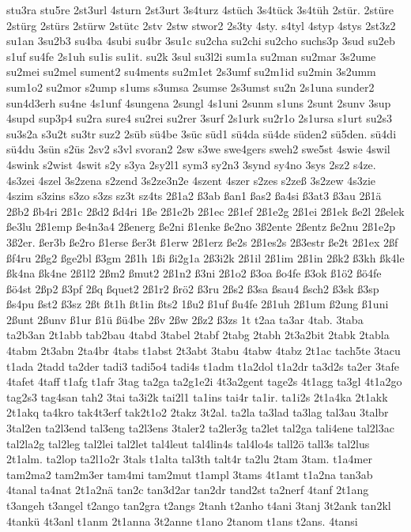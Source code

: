 {stu3ra
stu5re
2st3url
4sturn
2st3urt
3s4turz
4stüch
3s4tück
3s4tüh
2stür.
2stüre
2stürg
2stürs
2stürw
2stütc
2stv
2stw
stwor2
2s3ty
4sty.
s4tyl
4styp
4stys
2st3z2
su1an
3su2b3
su4ba
4subi
su4br
3su1c
su2cha
su2chi
su2cho
suchs3p
3sud
su2eb
s1uf
su4fe
2s1uh
su1is
su1it.
su2k
3sul
su3l2i
sum1a
su2man
su2mar
3s2ume
su2mei
su2mel
sument2
su4ments
su2m1et
2s3umf
su2m1id
su2min
3s2umm
sum1o2
su2mor
s2ump
s1ums
s3umsa
2sumse
2s3umst
su2n
2s1una
sunder2
sun4d3erh
su4ne
4s1unf
4sungena
2sungl
4s1uni
2sunm
s1uns
2sunt
2sunv
3sup
4supd
sup3p4
su2ra
sure4
su2rei
su2rer
3surf
2s1urk
su2r1o
2s1ursa
s1urt
su2s3
su3s2a
s3u2t
su3tr
suz2
2süb
sü4be
3süc
süd1
sü4da
sü4de
süden2
sü5den.
sü4di
sü4du
3sün
s2üs
2sv2
s3vl
svoran2
2sw
s3we
swe4gers
sweh2
swe5st
4swie
4swil
4swink
s2wist
4swit
s2y
s3ya
2sy2l1
sym3
sy2n3
3synd
sy4no
3sys
2sz2
s4ze.
4s3zei
4szel
3s2zena
s2zend
3s2ze3n2e
4szent
4szer
s2zes
s2zeß
3s2zew
4s3zie
4szim
s3zins
s3zo
s3zs
sz3t
sz4ts
2ß1a2
ß3ab
ßan1
ßas2
ßa4si
ß3at3
ß3au
2ß1ä
2ßb2
ßb4ri
2ß1c
2ßd2
ßd4ri
1ße
2ß1e2b
2ß1ec
2ß1ef
2ß1e2g
2ß1ei
2ß1ek
ße2l
2ßelek
ße3lu
2ß1emp
ße4n3a4
2ßenerg
ße2ni
ß1enke
ße2no
3ß2ente
2ßentz
ße2nu
2ß1e2p
3ß2er.
ßer3b
ße2ro
ß1erse
ßer3t
ß1erw
2ß1erz
ße2s
2ß1es2s
2ß3estr
ße2t
2ß1ex
2ßf
ßf4ru
2ßg2
ßge2bl
ß3gm
2ß1h
1ßi
ßi2g1a
2ß3i2k
2ß1il
2ß1im
2ß1in
2ßk2
ß3kh
ßk4le
ßk4na
ßk4ne
2ß1l2
2ßm2
ßmut2
2ß1n2
ß3ni
2ß1o2
ß3oa
ßo4fe
ß3ok
ß1ö2
ßö4fe
ßö4st
2ßp2
ß3pf
2ßq
ßquet2
2ß1r2
ßrö2
ß3ru
2ßs2
ß3sa
ßsau4
ßsch2
ß3sk
ß3sp
ßs4pu
ßst2
ß3sz
2ßt
ßt1h
ßt1in
ßts2
1ßu2
ß1uf
ßu4fe
2ß1uh
2ß1um
ß2ung
ß1uni
2ßunt
2ßunv
ß1ur
ß1ü
ßü4be
2ßv
2ßw
2ßz2
ß3zs
1t
t2aa
ta3ar
4tab.
3taba
ta2b3an
2t1abb
tab2bau
4tabd
3tabel
2tabf
2tabg
2tabh
2t3a2bit
2tabk
2tabla
4tabm
2t3abn
2ta4br
4tabs
t1abst
2t3abt
3tabu
4tabw
4tabz
2t1ac
tach5te
3tacu
t1ada
2tadd
ta2der
tadi3
tadi5o4
tadi4s
t1adm
t1a2dol
t1a2dr
ta3d2s
ta2er
3tafe
4tafet
4taff
t1afg
t1afr
3tag
ta2ga
ta2g1e2i
4t3a2gent
tage2s
4t1agg
ta3gl
4t1a2go
tag2s3
tag4san
tah2
3tai
ta3i2k
tai2l1
ta1ins
tai4r
ta1ir.
ta1i2s
2t1a4ka
2t1akk
2t1akq
ta4kro
tak4t3erf
tak2t1o2
2takz
3t2al.
ta2la
ta3lad
ta3lag
tal3au
3talbr
3tal2en
ta2l3end
tal3eng
ta2l3ens
3taler2
ta2ler3g
ta2let
tal2ga
tali4ene
tal2l3ac
tal2la2g
tal2leg
tal2lei
tal2let
tal4leut
tal4lin4s
tal4lo4s
tall2ö
tall3s
tal2lus
2t1alm.
ta2lop
ta2l1o2r
3tals
t1alta
tal3th
talt4r
ta2lu
2tam
3tam.
t1a4mer
tam2ma2
tam2m3er
tam4mi
tam2mut
t1ampl
3tams
4t1amt
t1a2na
tan3ab
4tanal
ta4nat
2t1a2nä
tan2c
tan3d2ar
tan2dr
tand2st
ta2nerf
4tanf
2t1ang
t3angeh
t3angel
t2ango
tan2gra
t2angs
2tanh
t2anho
t4ani
3tanj
3t2ank
tan2kl
4tankü
4t3anl
t1anm
2t1anna
3t2anne
t1ano
2tanom
t1ans
t2ans.
4tansi
}

